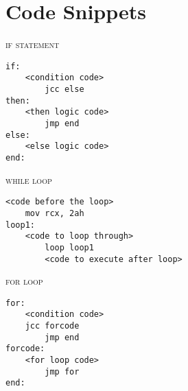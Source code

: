 \documentclass[a4paper,12pt]{article}
\begin{document}
\section{Code Snippets}
\lstset{language=[x86masm]Assembler}
\textsc{if statement}
\begin{lstlisting}[frame=single]
if:
	<condition code>
        jcc	else
then:
	<then logic code>
        jmp	end
else:
	<else logic code>
end:
\end{lstlisting}
\textsc{while loop}
\begin{lstlisting}[frame=single]
	<code before the loop>
	mov rcx, 2ah
loop1:
	<code to loop through>
        loop loop1
        <code to execute after loop>
\end{lstlisting}
\textsc{for loop}
\begin{lstlisting}[frame=single]
for:
	<condition code>
	jcc forcode
        jmp end
forcode:
	<for loop code>
        jmp for
end:
\end{lstlisting}

\newpage
{}
\tableofcontents
{}
\end{document}
